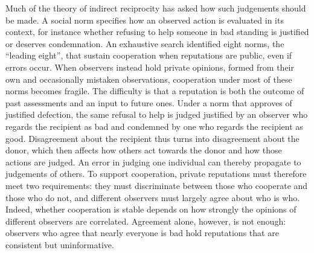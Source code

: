 Much of the theory of indirect reciprocity has asked how such judgements should be made. A social norm specifies how an observed action is evaluated in its context, for instance whether refusing to help someone in bad standing is justified or deserves condemnation\cite{ohtsuki2004,brandt2004}. An exhaustive search identified eight norms, the ``leading eight'', that sustain cooperation when reputations are public, even if errors occur\cite{ohtsuki2004,ohtsuki2006}. When observers instead hold private opinions, formed from their own and occasionally mistaken observations, cooperation under most of these norms becomes fragile\cite{takahashi2006,uchida2010,hilbe2018,perret2021,fujimoto2023}. The difficulty is that a reputation is both the outcome of past assessments and an input to future ones. Under a norm that approves of justified defection, the same refusal to help is judged justified by an observer who regards the recipient as bad and condemned by one who regards the recipient as good\cite{okada2020dilemmas}. Disagreement about the recipient thus turns into disagreement about the donor, which then affects how others act towards the donor and how those actions are judged. An error in judging one individual can thereby propagate to judgements of others\cite{hilbe2018,uchida2013,radzvilavicius2019,fujimoto2022}. To support cooperation, private reputations must therefore meet two requirements\cite{michelmata2024}: they must discriminate between those who cooperate and those who do not, and different observers must largely agree about who is who. Indeed, whether cooperation is stable depends on how strongly the opinions of different observers are correlated\cite{murase2024synchronization}. Agreement alone, however, is not enough: observers who agree that nearly everyone is bad hold reputations that are consistent but uninformative.


